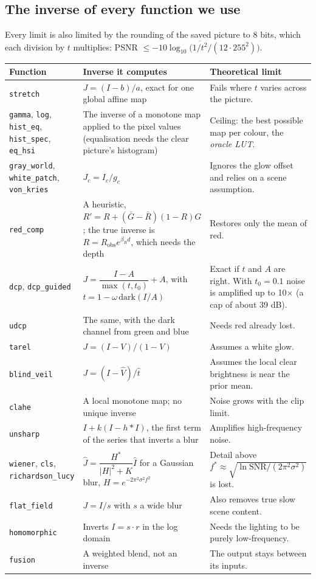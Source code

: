 \documentclass[10pt,a4paper]{article}
\begin{document}
\subsection{The inverse of every function we use}
Every limit is also limited by the rounding of the saved picture to 8 bits, which each division by $t$ multiplies: PSNR $\le -10\log_{10}\!\big(\overline{1/t^2}/(12\cdot255^2)\big)$.
{\small\begin{longtable}{p{2.5cm}p{6.1cm}p{6.8cm}}
\toprule Function & Inverse it computes & Theoretical limit\\\midrule\endhead
\texttt{stretch} & $J=(I-b)/a$, exact for one global affine map & Fails where $t$ varies across the picture.\\
\texttt{gamma}, \texttt{log}, \texttt{hist\_eq}, \texttt{hist\_spec}, \texttt{eq\_hsi} & The inverse of a monotone map applied to the pixel values (equalisation needs the clear picture's histogram) & Ceiling: the best possible map per colour, the \emph{oracle LUT}.\\
\texttt{gray\_world}, \texttt{white\_patch}, \texttt{von\_kries} & $J_c=I_c/g_c$ & Ignores the glow offset and relies on a scene assumption.\\
\texttt{red\_comp} & A heuristic, $R'=R+(\bar G-\bar R)(1-R)G$; the true inverse is $R=R_{\mathrm{obs}}e^{\beta_Rd}$, which needs the depth & Restores only the mean of red.\\
\texttt{dcp}, \texttt{dcp\_guided} & $J=\dfrac{I-A}{\max(t,t_0)}+A$, with $t=1-\omega\,\mathrm{dark}(I/A)$ & Exact if $t$ and $A$ are right. With $t_0=0.1$ noise is amplified up to 10$\times$ (a cap of about 39 dB).\\
\texttt{udcp} & The same, with the dark channel from green and blue & Needs red already lost.\\
\texttt{tarel} & $J=(I-V)/(1-V)$ & Assumes a white glow.\\
\texttt{blind\_veil} & $J=(I-\hat V)/\hat t$ & Assumes the local clear brightness is near the prior mean.\\
\texttt{clahe} & A local monotone map; no unique inverse & Noise grows with the clip limit.\\
\texttt{unsharp} & $I+k(I-h\!*\!I)$, the first term of the series that inverts a blur & Amplifies high-frequency noise.\\
\texttt{wiener}, \texttt{cls}, \texttt{richardson\_lucy} & $\hat J=\dfrac{H^*}{|H|^2+K}\hat I$ for a Gaussian blur, $H=e^{-2\pi^2\sigma^2f^2}$ & Detail above $f^*\approx\sqrt{\ln\mathrm{SNR}/(2\pi^2\sigma^2)}$ is lost.\\
\texttt{flat\_field} & $J=I/s$ with $s$ a wide blur & Also removes true slow scene content.\\
\texttt{homomorphic} & Inverts $I=s\cdot r$ in the log domain & Needs the lighting to be purely low-frequency.\\
\texttt{fusion} & A weighted blend, not an inverse & The output stays between its inputs.\\\bottomrule
\end{longtable}}
\end{document}
